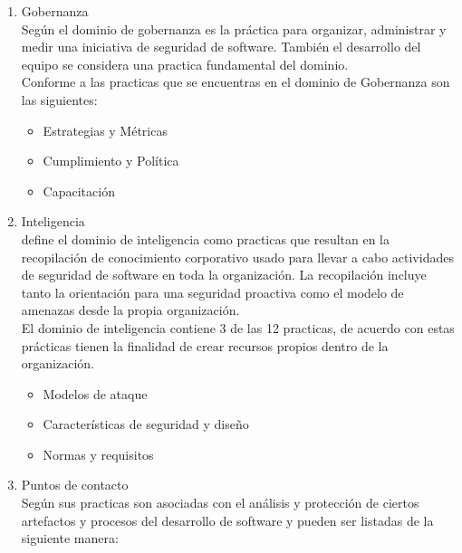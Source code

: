 \documentclass[runningheads,a4paper]{llncs}
\begin{document}
\begin{enumerate}

\item Gobernanza\\

Según \cite{BSIMM_b} el dominio de gobernanza es la práctica para organizar, administrar y medir una iniciativa de seguridad de software. También el desarrollo del equipo se considera una practica fundamental del dominio.\\
	
Conforme a \cite{BSIMM_b} las practicas que se encuentras en el dominio  de Gobernanza son las siguientes:\\
	
		\begin{itemize}
			 \item Estrategias y Métricas
			 \item Cumplimiento y Política
			 \item Capacitación\\
		\end{itemize}

\item Inteligencia\\

\cite{BSIMM_b} define el dominio de inteligencia como practicas que resultan en la recopilación  de conocimiento corporativo usado para llevar a cabo actividades de seguridad de software en toda la organización. La recopilación incluye tanto la orientación para una seguridad proactiva como el modelo de amenazas desde la propia organización.\\

El dominio de inteligencia contiene 3 de las 12 practicas, de acuerdo con \cite{BSIMM_b} estas prácticas tienen la finalidad de crear recursos  propios dentro de la organización.\\

\begin{itemize}
			 \item Modelos de ataque
			 \item Características de seguridad y diseño
			 \item Normas y requisitos\\
\end{itemize}


\item Puntos de contacto\\

Según \cite{BSIMM_b} sus practicas son asociadas con el análisis y protección de ciertos artefactos y procesos del desarrollo de software y pueden ser listadas de la siguiente manera:\\


\end{enumerate}
\end{document}
